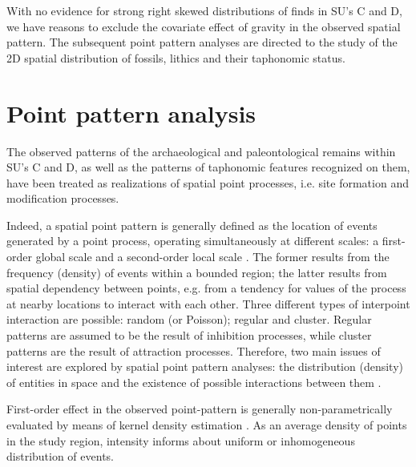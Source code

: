 \documentclass[review,authoryear]{elsarticle} %
\begin{document}
With no evidence for strong right skewed distributions of finds in SU's C and D, we have reasons to exclude the covariate effect of gravity in the observed spatial pattern. The subsequent point pattern analyses are directed to the study of the 2D spatial distribution of fossils, lithics and their taphonomic status.

\section{Point pattern analysis}

The observed patterns of the archaeological and paleontological remains within SU's C and D, as well as the patterns of taphonomic features recognized on them, have been treated as realizations of spatial point processes, i.e. site formation and modification processes.

Indeed, a spatial point pattern is generally defined as the location of events generated by a point process, operating simultaneously at different scales: a first-order global scale and a second-order local scale \citep{Bailey1995}. The former results from the frequency (density) of events within a bounded region; the latter results from spatial dependency between points, e.g. from a tendency for values of the process at nearby locations to interact with each other. Three different types of interpoint interaction are possible: random (or Poisson); regular and cluster. Regular patterns are assumed to be the result of inhibition processes, while cluster patterns are the result of attraction processes. Therefore, two main issues of interest are explored by spatial point pattern analyses: the distribution (density) of entities in space and the existence of possible interactions between them \citep{Ord1972}.

First-order effect in the observed point-pattern is generally non-parametrically evaluated by means of kernel density estimation \citep{Diggle1985}. As an average density of points in the study region, intensity informs about uniform or inhomogeneous distribution of events.
\end{document}
